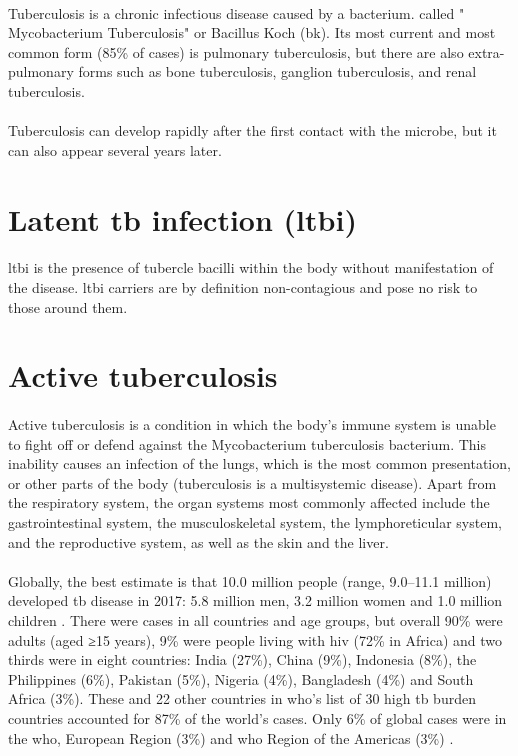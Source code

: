 \paragraph{}
Tuberculosis is a chronic infectious disease caused by a bacterium. called " Mycobacterium Tuberculosis" or Bacillus Koch (\ac{bk}). Its most current and most common form (85\% of cases) is pulmonary tuberculosis, but there are also extra-pulmonary forms such as bone tuberculosis, ganglion tuberculosis, and renal tuberculosis.
\paragraph{}
Tuberculosis can develop rapidly after the first contact with the microbe, but it can also appear several years later.
\section{Latent \ac{tb} infection (\ac{ltbi})}
\paragraph{}
\ac{ltbi} is the presence of tubercle bacilli within the body without manifestation of the disease. \ac{ltbi} carriers are by definition non-contagious and pose no risk to those around them.
\section{Active tuberculosis}
\paragraph{}
Active tuberculosis is a condition in which the body’s immune system is unable to fight off or defend against the Mycobacterium tuberculosis bacterium. This inability causes an infection of the lungs, which is the most common presentation, or other parts of the body (tuberculosis is a multisystemic disease). Apart from the respiratory system, the organ systems most commonly affected include the gastrointestinal system, the musculoskeletal system, the lymphoreticular system, and the reproductive system, as well as the skin and the liver.
\paragraph{}
Globally, the best estimate is that 10.0 million people (range, 9.0–11.1 million) developed \ac{tb} disease in 2017: 5.8 million men, 3.2 million women and 1.0 million children \cite{TBT:3}. There were cases in all countries and age groups, but overall 90\% were adults (aged ≥15 years), 9\% were people living with \ac{hiv} (72\% in Africa) and two thirds were in eight countries: India (27\%), China (9\%), Indonesia (8\%), the Philippines (6\%), Pakistan (5\%), Nigeria (4\%), Bangladesh (4\%) and South Africa (3\%). These and 22 other countries in \ac{who}’s list of 30 high \ac{tb} burden countries accounted for 87\% of the world’s cases\cite{TBT:3}. Only 6\% of global cases were in the \ac{who}, European Region (3\%) and \ac{who} Region of the Americas (3\%)
\cite{TBT:3}.
\newpage
